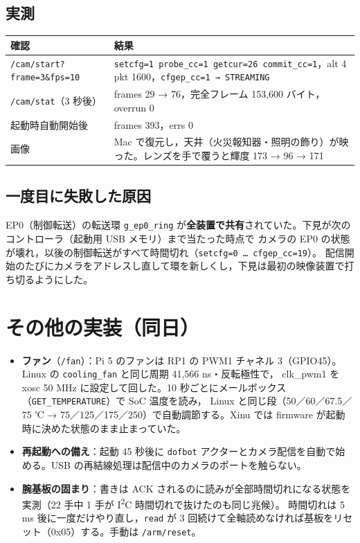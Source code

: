 \documentclass[a4paper,11pt]{article}
\begin{document}
\subsection*{実測}
\begin{center}\footnotesize
\begin{tabular}{@{}p{}p{}@{}}
\toprule
確認 & 結果 \\
\midrule
\texttt{/cam/start?frame=3\&fps=10} & \texttt{setcfg=1 probe\_cc=1 getcur=26 commit\_cc=1}，alt 4 pkt 1600，\texttt{cfgep\_cc=1 → STREAMING} \\
\texttt{/cam/stat}（3 秒後） & frames 29 → 76，完全フレーム 153,600 バイト，overrun 0 \\
起動時自動開始後 & frames 393，errs 0 \\
画像 & Mac で復元し，天井（火災報知器・照明の飾り）が映った。レンズを手で覆うと輝度 173 → 96 → 171 \\
\bottomrule
\end{tabular}
\end{center}

\subsection*{一度目に失敗した原因}
EP0（制御転送）の転送環 \texttt{g\_ep0\_ring} が\textbf{全装置で共有}されていた。下見が次のコントローラ（起動用 USB メモリ）まで当たった時点で
カメラの EP0 の状態が壊れ，以後の制御転送がすべて時間切れ（\texttt{setcfg=0 … cfgep\_cc=19}）。
配信開始のたびにカメラをアドレスし直して環を新しくし，下見は最初の映像装置で打ち切るようにした。

\section{その他の実装（同日）}
\begin{itemize}
  \item \textbf{ファン}（\texttt{/fan}）：Pi 5 のファンは RP1 の PWM1 チャネル 3（GPIO45）。Linux の \texttt{cooling\_fan} と同じ周期 41,566 ns・反転極性で，
        clk\_pwm1 を xosc 50 MHz に設定して回した。10 秒ごとにメールボックス（\texttt{GET\_TEMPERATURE}）で SoC 温度を読み，
        Linux と同じ段（50／60／67.5／75 ℃ → 75／125／175／250）で自動調節する。Xinu では firmware が起動時に決めた状態のまま止まっていた。
  \item \textbf{再起動への備え}：起動 45 秒後に \texttt{dofbot} アクターとカメラ配信を自動で始める。USB の再結線処理は配信中のカメラのポートを触らない。
  \item \textbf{腕基板の固まり}：書きは ACK されるのに読みが全部時間切れになる状態を実測（22 手中 1 手が I\textsuperscript{2}C 時間切れで抜けたのも同じ兆候）。
        時間切れは 5 ms 後に一度だけやり直し，\texttt{read} が 3 回続けて全軸読めなければ基板をリセット（0x05）する。手動は \texttt{/arm/reset}。
\end{itemize}
\end{document}
